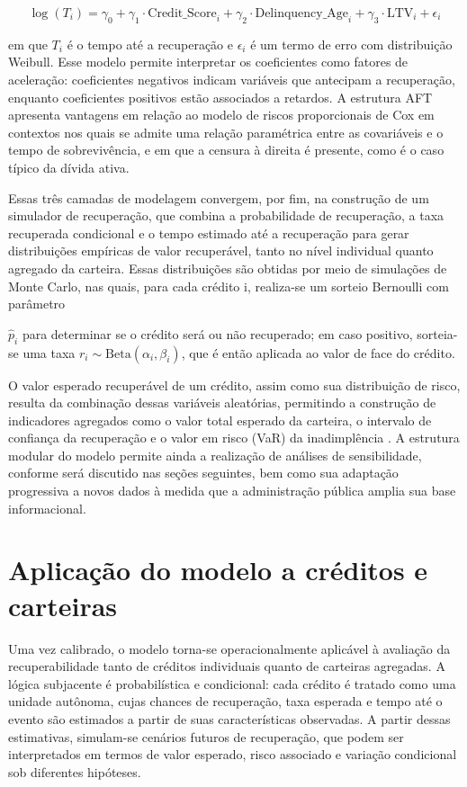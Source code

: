 \documentclass[a4paper,12pt]{article}
\begin{document}
\[ \log(T_i) = \gamma_0 + \gamma_1 \cdot \text{Credit\_Score}_i + \gamma_2 \cdot \text{Delinquency\_Age}_i + \gamma_3 \cdot \text{LTV}_i + \epsilon_i \]
 
em que $T_i$ é o tempo até a recuperação e $\epsilon_i$ é um termo de erro com distribuição Weibull. Esse modelo permite interpretar os coeficientes como fatores de aceleração: coeficientes negativos indicam variáveis que antecipam a recuperação, enquanto coeficientes positivos estão associados a retardos. A estrutura AFT apresenta vantagens em relação ao modelo de riscos proporcionais de Cox em contextos nos quais se admite uma relação paramétrica entre as covariáveis e o tempo de sobrevivência, e em que a censura à direita é presente, como é o caso típico da dívida ativa.

Essas três camadas de modelagem convergem, por fim, na construção de um simulador de recuperação, que combina a probabilidade de recuperação, a taxa recuperada condicional e o tempo estimado até a recuperação para gerar distribuições empíricas de valor recuperável, tanto no nível individual quanto agregado da carteira. Essas distribuições são obtidas por meio de simulações de Monte Carlo, nas quais, para cada crédito i, realiza-se um sorteio Bernoulli com parâmetro 

$\hat{p}_{i}$ para determinar se o crédito será ou não recuperado; em caso positivo, sorteia-se uma taxa $r_i \sim \text{Beta}(\alpha_i, \beta_i)$, que é então aplicada ao valor de face do crédito.

O valor esperado recuperável de um crédito, assim como sua distribuição de risco, resulta da combinação dessas variáveis aleatórias, permitindo a construção de indicadores agregados como o valor total esperado da carteira, o intervalo de confiança da recuperação e o valor em risco (VaR) da inadimplência \cite{bolder2018credit}. A estrutura modular do modelo permite ainda a realização de análises de sensibilidade, conforme será discutido nas seções seguintes, bem como sua adaptação progressiva a novos dados à medida que a administração pública amplia sua base informacional.


\section{Aplicação do modelo a créditos e carteiras}
Uma vez calibrado, o modelo torna-se operacionalmente aplicável à avaliação da recuperabilidade tanto de créditos individuais quanto de carteiras agregadas. A lógica subjacente é probabilística e condicional: cada crédito é tratado como uma unidade autônoma, cujas chances de recuperação, taxa esperada e tempo até o evento são estimados a partir de suas características observadas. A partir dessas estimativas, simulam-se cenários futuros de recuperação, que podem ser interpretados em termos de valor esperado, risco associado e variação condicional sob diferentes hipóteses.
\end{document}
